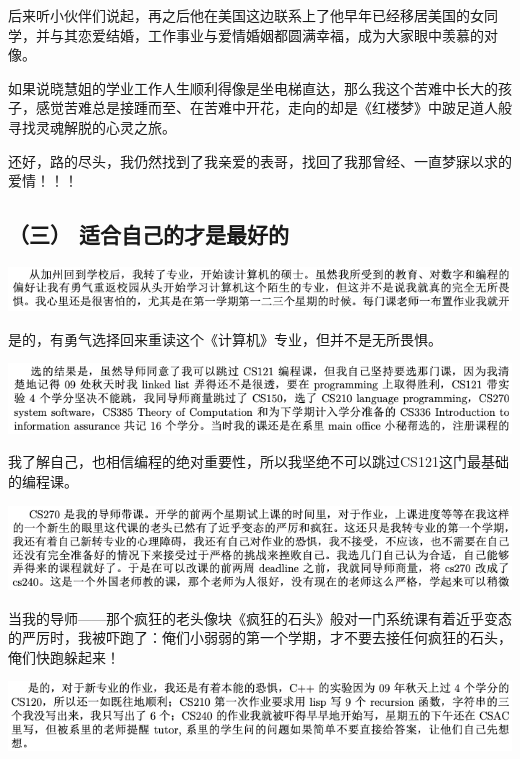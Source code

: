 \documentclass[9pt, b5paper]{article}
\begin{document}
后来听小伙伴们说起，再之后他在美国这边联系上了他早年已经移居美国的女同学，并与其恋爱结婚，工作事业与爱情婚姻都圆满幸福，成为大家眼中羡慕的对像。 

如果说晓慧姐的学业工作人生顺利得像是坐电梯直达，那么我这个苦难中长大的孩子，感觉苦难总是接踵而至、在苦难中开花，走向的却是《红楼梦》中跛足道人般寻找灵魂解脱的心灵之旅。

还好，路的尽头，我仍然找到了我亲爱的表哥，找回了我那曾经、一直梦寐以求的爱情！！！

\subsection{（三） 适合自己的才是最好的}
\label{sec:orgad02fb8}

\begin{center}
\includegraphics[width=.9\linewidth]{./pic/backups_plans_20210425_112131.png}
\end{center}

是的，有勇气选择回来重读这个《计算机》专业，但并不是无所畏惧。

\begin{center}
\includegraphics[width=.9\linewidth]{./pic/backups_plans_20210424_203000.png}
\end{center}

我了解自己，也相信编程的绝对重要性，所以我坚绝不可以跳过CS121这门最基础的编程课。

\begin{center}
\includegraphics[width=.9\linewidth]{./pic/backups_plans_20210424_203059.png}
\end{center}

当我的导师——那个疯狂的老头像块《疯狂的石头》般对一门系统课有着近乎变态的严厉时，我被吓跑了：俺们小弱弱的第一个学期，才不要去接任何疯狂的石头，俺们快跑躲起来！

\begin{center}
\includegraphics[width=.9\linewidth]{./pic/backups_plans_20210424_203308.png}
\end{center}
\end{document}
